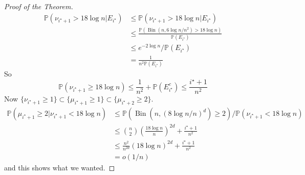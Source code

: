 \begin{proof}[Proof of the Theorem]
    \begin{align*}
        \mathbb P(\nu_{i^\star+1}>18\log n|E_{i^\star})&\le\mathbb P(\nu_{i^\star+1}>18\log n|E_{i^\star})\\
        &\le\frac{\mathbb P(\operatorname{Bin}(n,6\log n/n^2)>18\log n)}{\mathbb P(E_{i^\star})}\\
        &\le e^{-2\log n}/\mathbb P(E_{i^\star})\\
        &=\frac{1}{n^2\mathbb P(E_{i^\star})}
    \end{align*}
    So
    $$\mathbb P(\nu_{i^\star+1}\ge 18\log n)\le\frac{1}{n^2}+\mathbb P(E_{i^\star}^c)\le\frac{i^\star+1}{n^2}$$
    Now $\{\nu_{i^\star+1}\ge 1\}\subset\{\mu_{i^\star+1}\ge 1\}\subset\{\mu_{i^\star+2}\ge 2\}$.
    \begin{align*}
        \mathbb P(\mu_{i^\star+1}\ge 2|\nu_{i^\star+1}<18\log n)&\le\mathbb P(\operatorname{Bin}(n,(8\log n/n)^d)\ge 2)/\mathbb P(\nu_{i^\star+1}<18\log n)\\
        &\le\binom{n}{2}\left( \frac{18\log n}{n} \right)^{2d}+\frac{i^\star+1}{n^2}\\
        &\le\frac{n^2}{n^{2d}}(18\log n)^{2d}+\frac{i^\star+1}{n^2}\\
        &=o(1/n)
    \end{align*}
    and this shows what we wanted.
\end{proof}
